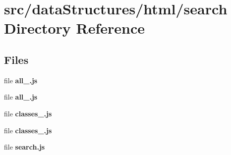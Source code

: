 \section{src/data\-Structures/html/search Directory Reference}
\label{dir_0a2e7e9a1409c7bac4cbc42ad7493ce5}
\subsection*{Files}
\begin{DoxyCompactItemize}
\item 
file {\bf all\-\_.\-js}
\item 
file {\bf all\-\_.\-js}
\item 
file {\bf classes\-\_.\-js}
\item 
file {\bf classes\-\_.\-js}
\item 
file {\bf search.\-js}
\end{DoxyCompactItemize}
